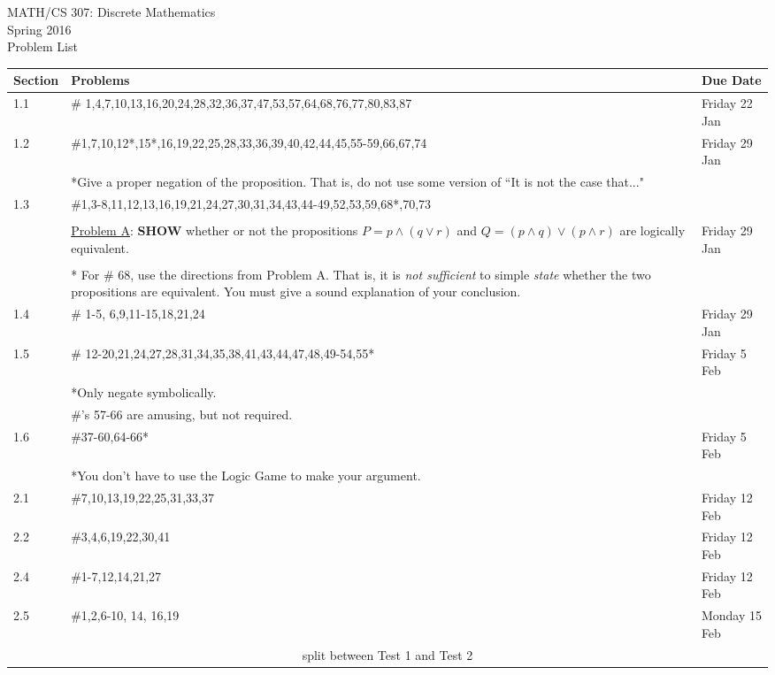 \documentclass[11pt]{article}
\begin{document}
\begin{center}MATH/CS 307:  Discrete Mathematics \\ Spring 2016 \\ Problem List\end{center}

\begin{tabular}{|p{1.6cm}|p{12cm}|p{3cm}|}
\hline
Section & Problems & Due Date\\
\hline \hline
1.1 & \# 1,4,7,10,13,16,20,24,28,32,36,37,47,53,57,64,68,76,77,80,83,87& Friday 22 Jan \\
\hline
1.2 & \#1,7,10,12*,15*,16,19,22,25,28,33,36,39,40,42,44,45,55-59,66,67,74 & Friday 29 Jan \\
&*Give a proper negation of the proposition. That is, do not use some version of ``It is not the case that..."&\\
\hline
1.3 & \#1,3-8,11,12,13,16,19,21,24,27,30,31,34,43,44-49,52,53,59,68*,70,73&\\
&&\\
& \underline{Problem A}: \textbf{SHOW} whether or not the propositions $P=p \wedge(q\vee r)$ and $Q=(p \wedge q) \vee (p \wedge r)$ are logically equivalent.&Friday 29 Jan\\
&&\\
& * For \# 68, use the directions from Problem A. That is, it is \emph{not sufficient} to simple \emph{state} whether the two propositions are equivalent. You must give a sound explanation of your conclusion.&\\
\hline
1.4 & \# 1-5, 6,9,11-15,18,21,24& Friday 29 Jan\\
\hline
1.5 & \# 12-20,21,24,27,28,31,34,35,38,41,43,44,47,48,49-54,55*&Friday 5 Feb\\
& *Only negate symbolically. &\\
& \#'s 57-66 are amusing, but not required. & \\
\hline
1.6 & \#37-60,64-66*&Friday 5 Feb\\
&*You don't have to use the Logic Game to make your argument.&\\
\hline
2.1 & \#7,10,13,19,22,25,31,33,37& Friday 12 Feb \\
\hline
2.2 & \#3,4,6,19,22,30,41& Friday 12 Feb\\
\hline
2.4 & \#1-7,12,14,21,27& Friday 12 Feb\\
\hline
2.5 & \#1,2,6-10, 14, 16,19& Monday 15 Feb\\
\hline
\hline
\multicolumn{3}{c}{split between Test 1 and Test 2}\\

\end{tabular}
\end{document}
